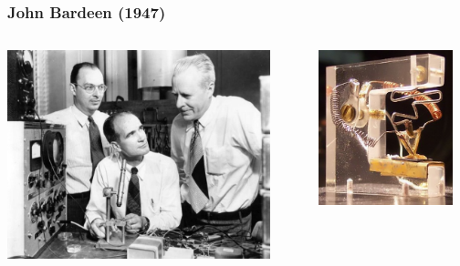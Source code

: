 \documentclass[14pt]{beamer}
\begin{document}
\begin{frame}
	\frametitle{John Bardeen (1947)}
	\begin{center}
		\begin{columns}
			\begin{column}{0.5\textwidth}
		\includegraphics[width=0.9\textwidth]{john_bardeen.jpg}
			\end{column}
			\begin{column}{0.5\textwidth}
		\includegraphics[width=0.9\textwidth]{john_bardeen_transistor.jpg}
			\end{column}
		\end{columns}
		
		\vspace*{1em}
	\end{center}
\end{frame}
\end{document}
